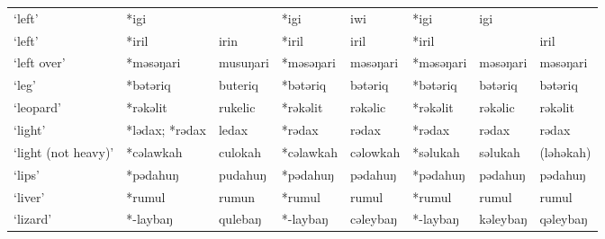 \begin{landscape}
\begin{longtable}[c]{@{}p{3cm}<{\raggedright}p{2.75cm}<{\raggedright}p{2.75cm}<{\raggedright}p{2.75cm}<{\raggedright}p{2.75cm}<{\raggedright}p{2.75cm}<{\raggedright}p{2.75cm}<{\raggedright}p{2.75cm}<{\raggedright}@{}}
`left'                                               & *igi               &                                & *igi               & iwi                        & *igi             & igi                      &                                   \\
`left'                                               & *iril              & irin                           & *iril              & iril                       & *iril            &                          & iril                              \\
`left over'                                          & *məsəŋari          & musuŋari                       & *məsəŋari          & məsəŋari                   & *məsəŋari        & məsəŋari                 & məsəŋari                          \\
`leg'                                                & *bətəriq           & buteriq                        & *bətəriq           & bətəriq                    & *bətəriq         & bətəriq                  & bətəriq                           \\
`leopard'                                            & *rəkəlit           & rukelic                        & *rəkəlit           & rəkəlic                    & *rəkəlit         & rəkəlic                  & rəkəlit                           \\
`light'                                              & *lədax; *rədax             & ledax                          & *rədax             & rədax                      & *rədax           & rədax                    & rədax                             \\
`light (not heavy)'                                  & *cəlawkah          & culokah                        & *cəlawkah          & cəlowkah                   & *səlukah         & səlukah                  & (ləhəkah)                         \\
`lips'                                               & *pədahuŋ           & pudahuŋ                        & *pədahuŋ           & pədahuŋ                    & *pədahuŋ         & pədahuŋ                  & pədahuŋ                           \\
`liver'                                              & *rumul             & rumun                          & *rumul             & rumul                      & *rumul           & rumul                    & rumul                             \\
`lizard'                                             & *-laybaŋ           & qulebaŋ                        & *-laybaŋ           & cəleybaŋ                   & *-laybaŋ         & kəleybaŋ                 & qəleybaŋ                          \\

\end{longtable}
\end{landscape}
